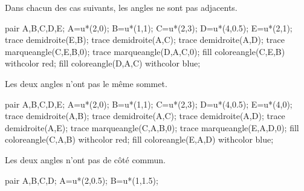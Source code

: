 \begin{remarques}
Dans chacun des cas suivants, les angles ne sont pas adjacents.
   \begin{changemargin}{-10mm}{-10mm}
      \begin{minipage}{0.25\linewidth}
         \begin{center}
            \begin{Geometrie}[CoinHD={(4.5u,3.5u)}]
               pair A,B,C,D,E;
               A=u*(2,0);
               B=u*(1,1);
               C=u*(2,3);
               D=u*(4,0.5);
               E=u*(2,1);
               trace demidroite(E,B);
               trace demidroite(A,C);
               trace demidroite(A,D);
               trace marqueangle(C,E,B,0);
               trace marqueangle(D,A,C,0);
               fill coloreangle(C,E,B) withcolor red;
               fill coloreangle(D,A,C) withcolor blue;
            \end{Geometrie}
            \par
            Les deux angles n'ont pas le même sommet. 
         \end{center}
      \end{minipage}
      \hfill
      \begin{minipage}{0.25\linewidth}
         \begin{center}
            \begin{Geometrie}[CoinHD={(4.5u,3.5u)}]
               pair A,B,C,D,E;
               A=u*(2,0);
               B=u*(1,1);
               C=u*(2,3);
               D=u*(4,0.5);
               E=u*(4,0);
               trace demidroite(A,B);
               trace demidroite(A,C);
               trace demidroite(A,D);
               trace demidroite(A,E);
               trace marqueangle(C,A,B,0);
               trace marqueangle(E,A,D,0);
               fill coloreangle(C,A,B) withcolor red;
               fill coloreangle(E,A,D) withcolor blue;
            \end{Geometrie}
            \par
            Les deux angles n'ont pas de côté commun. 
         \end{center}
      \end{minipage}
      \hfill
      \begin{minipage}{0.4\linewidth}
         \begin{center}
            \begin{Geometrie}[CoinHD={(5u,4.3u)}]
               pair A,B,C,D;
               A=u*(2,0.5);
               B=u*(1,1.5);

\end{Geometrie}
\end{center}
\end{minipage}
\end{changemargin}
\end{remarques}
